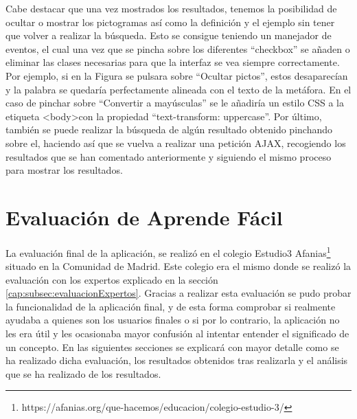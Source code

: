 Cabe destacar que una vez mostrados los resultados, tenemos la posibilidad de ocultar o mostrar los pictogramas así como la definición y el ejemplo sin tener que volver a realizar la búsqueda. Esto se consigue teniendo un manejador de eventos, el cual una vez que se pincha sobre los diferentes ``checkbox'' se añaden o eliminar las clases necesarias para que la interfaz se vea siempre correctamente. Por ejemplo, si en la Figura se pulsara sobre ``Ocultar pictos'', estos desaparecían y la palabra se quedaría perfectamente alineada con el texto de la metáfora. En el caso de pinchar sobre ``Convertir a mayúsculas'' se le añadiría un estilo CSS a la etiqueta <body>con la propiedad ``text-transform: uppercase''.
Por último, también se puede realizar la búsqueda de algún resultado obtenido pinchando sobre el, haciendo así que se vuelva a realizar una petición AJAX, recogiendo los resultados que se han comentado anteriormente y siguiendo el mismo proceso para mostrar los resultados.

\section{Evaluación de Aprende Fácil}
\label{cap:sec:evaluacionApp}

La evaluación final de la aplicación, se realizó en el colegio Estudio3 Afanias\footnote{https://afanias.org/que-hacemos/educacion/colegio-estudio-3/} situado en la Comunidad de Madrid. Este colegio era el mismo donde se realizó la evaluación con los expertos explicado en la sección \ref{cap:subsec:evaluacionExpertos}.
Gracias a realizar esta evaluación se pudo probar la funcionalidad de la aplicación final, y de esta forma comprobar si realmente ayudaba  a quienes son los usuarios  finales o si por lo contrario, la aplicación no les era útil y les ocasionaba mayor confusión al intentar entender el significado de un concepto.
En las siguientes secciones se explicará con mayor detalle como se ha realizado dicha evaluación, los resultados obtenidos tras realizarla y el análisis que se ha realizado de los resultados.
